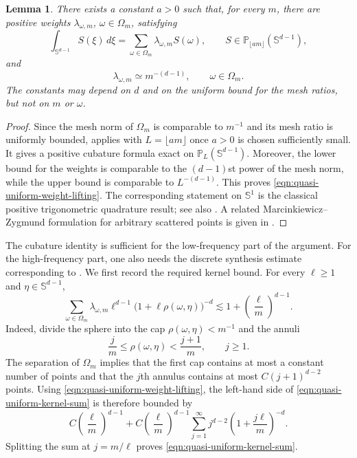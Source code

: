 \documentclass{article}
\numberwithin{equation}{section}
\newtheorem{lemma}{Lemma}
\def\SS{\mathbb{S}}
\begin{document}
\begin{lemma}\label{lem:quasi-uniform-cubature-lifting}
There exists a constant $a>0$ such that, for every $m$, there are positive weights $\lambda_{\omega,m}$, $\omega\in\Omega_m$, satisfying
\begin{equation}\label{eqn:quasi-uniform-cubature-lifting}
\int_{\SS^{d-1}}S(\xi)\,d\xi
=
\sum_{\omega\in\Omega_m}\lambda_{\omega,m}S(\omega),
\qquad
S\in\mathbb P_{\lfloor am\rfloor}(\SS^{d-1}),
\end{equation}
and
\begin{equation}\label{eqn:quasi-uniform-weight-lifting}
\lambda_{\omega,m}\simeq m^{-(d-1)},
\qquad
\omega\in\Omega_m.
\end{equation}
The constants may depend on $d$ and on the uniform bound for the mesh ratios, but not on $m$ or $\omega$.
\end{lemma}

\begin{proof}
Since the mesh norm of $\Omega_m$ is comparable to $m^{-1}$ and its mesh ratio is uniformly bounded, \cite[Corollary~4.4]{narcowich2006localized} applies with $L=\lfloor am\rfloor$ once $a>0$ is chosen sufficiently small. It gives a positive cubature formula exact on $\mathbb P_L(\SS^{d-1})$. Moreover, the lower bound for the weights is comparable to the $(d-1)$st power of the mesh norm, while the upper bound is comparable to $L^{-(d-1)}$. This proves \eqref{eqn:quasi-uniform-weight-lifting}. The corresponding statement on $\SS^1$ is the classical positive trigonometric quadrature result; see also \cite{mhaskar2001spherical}. A related Marcinkiewicz--Zygmund formulation for arbitrary scattered points is given in \cite[Theorem~2.1]{leGiaMhaskar2009localized}.
\end{proof}

The cubature identity is sufficient for the low-frequency part of the argument. For the high-frequency part, one also needs the discrete synthesis estimate corresponding to \cite[Lemmas~4.2--4.4]{petrushev1998approximation}. We first record the required kernel bound. For every $\ell\geq1$ and $\eta\in\SS^{d-1}$,
\begin{equation}\label{eqn:quasi-uniform-kernel-sum}
\sum_{\omega\in\Omega_m}
\lambda_{\omega,m}\ell^{d-1}
\bigl(1+\ell\rho(\omega,\eta)\bigr)^{-d}
\lesssim
1+\left(\frac{\ell}{m}\right)^{d-1}.
\end{equation}
Indeed, divide the sphere into the cap $\rho(\omega,\eta)<m^{-1}$ and the annuli
$$
\frac{j}{m}\leq\rho(\omega,\eta)<\frac{j+1}{m},
\qquad j\geq1.
$$
The separation of $\Omega_m$ implies that the first cap contains at most a constant number of points and that the $j$th annulus contains at most $C(j+1)^{d-2}$ points. Using \eqref{eqn:quasi-uniform-weight-lifting}, the left-hand side of \eqref{eqn:quasi-uniform-kernel-sum} is therefore bounded by
$$
C\left(\frac{\ell}{m}\right)^{d-1}
+
C\left(\frac{\ell}{m}\right)^{d-1}
\sum_{j=1}^{\infty}
j^{d-2}
\left(1+\frac{j\ell}{m}\right)^{-d}.
$$
Splitting the sum at $j=m/\ell$ proves \eqref{eqn:quasi-uniform-kernel-sum}.
\end{document}
